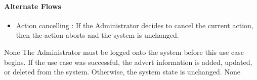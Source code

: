 {  \paragraph{Alternate Flows}
  \begin{itemize}
    \item Action cancelling : If the Administrator decides to cancel the current action, then the action aborts and the system is unchanged.
  \end{itemize}
}
{None}
{The Administrator must be logged onto the system before this use case begins.}
{If the use case was successful, the advert information is added, updated, or deleted from the system. Otherwise, the system state is unchanged.}
{None}